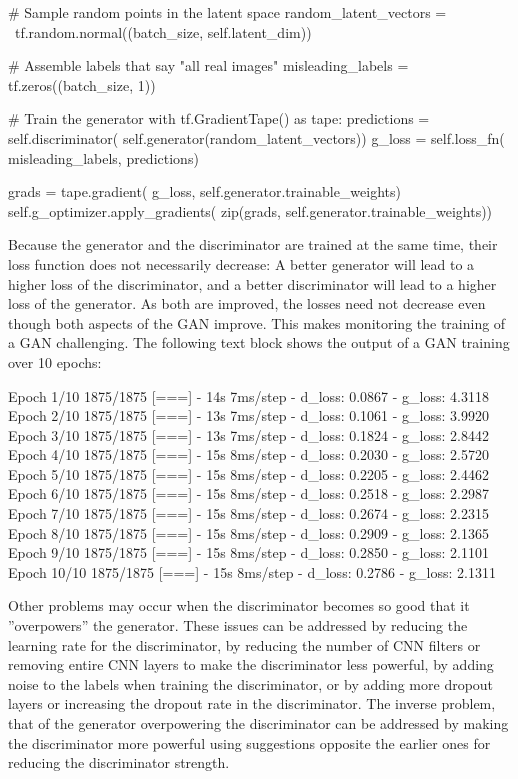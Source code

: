 \begin{pythoncode}
        # Sample random points in the latent space
        random_latent_vectors = \
            tf.random.normal((batch_size, self.latent_dim))

        # Assemble labels that say "all real images"
        misleading_labels = tf.zeros((batch_size, 1))

        # Train the generator 
        with tf.GradientTape() as tape:
            predictions = self.discriminator(
                self.generator(random_latent_vectors))
            g_loss = self.loss_fn(
                misleading_labels, predictions)

        grads = tape.gradient(
            g_loss, 
            self.generator.trainable_weights)
        self.g_optimizer.apply_gradients(
            zip(grads, self.generator.trainable_weights))
\end{pythoncode}

Because the generator and the discriminator are trained at the same time, their loss function does not necessarily decrease: A better generator will lead to a higher loss of the discriminator, and a better discriminator will lead to a higher loss of the generator. As both are improved, the losses need not decrease even though both aspects of the GAN improve. This makes monitoring the training of a GAN challenging. The following text block shows the output of a GAN training over 10 epochs:

\begin{textcode}
Epoch 1/10
1875/1875 [===] - 14s 7ms/step - d_loss: 0.0867 - g_loss: 4.3118
Epoch 2/10
1875/1875 [===] - 13s 7ms/step - d_loss: 0.1061 - g_loss: 3.9920
Epoch 3/10
1875/1875 [===] - 13s 7ms/step - d_loss: 0.1824 - g_loss: 2.8442
Epoch 4/10
1875/1875 [===] - 15s 8ms/step - d_loss: 0.2030 - g_loss: 2.5720
Epoch 5/10
1875/1875 [===] - 15s 8ms/step - d_loss: 0.2205 - g_loss: 2.4462
Epoch 6/10
1875/1875 [===] - 15s 8ms/step - d_loss: 0.2518 - g_loss: 2.2987
Epoch 7/10
1875/1875 [===] - 15s 8ms/step - d_loss: 0.2674 - g_loss: 2.2315
Epoch 8/10
1875/1875 [===] - 15s 8ms/step - d_loss: 0.2909 - g_loss: 2.1365
Epoch 9/10
1875/1875 [===] - 15s 8ms/step - d_loss: 0.2850 - g_loss: 2.1101
Epoch 10/10
1875/1875 [===] - 15s 8ms/step - d_loss: 0.2786 - g_loss: 2.1311
\end{textcode}

Other problems may occur when the discriminator becomes so good that it ''overpowers'' the generator. These issues can be addressed by reducing the learning rate for the discriminator, by reducing the number of CNN filters or removing entire CNN layers to make the discriminator less powerful, by adding noise to the labels when training the discriminator, or by adding more dropout layers or increasing the dropout rate in the discriminator. The inverse problem, that of the generator overpowering the discriminator can be addressed by making the discriminator more powerful using suggestions opposite the earlier ones for reducing the discriminator strength.

